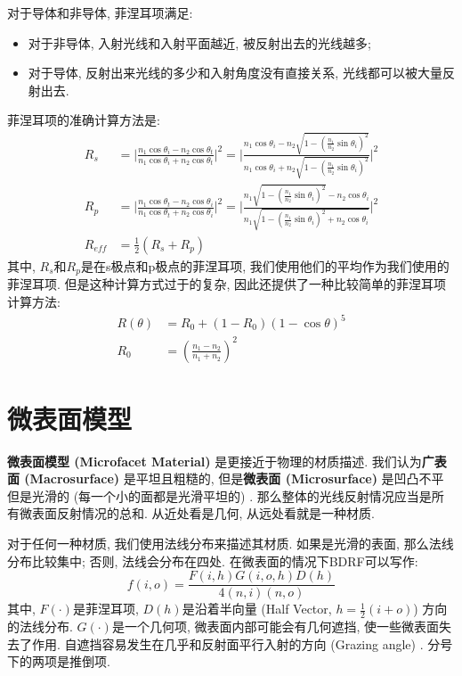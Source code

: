 \documentclass[openany]{progbookcn}
\begin{document}
对于导体和非导体, 菲涅耳项满足: 
\begin{itemize}
	\item 对于非导体, 入射光线和入射平面越近, 被反射出去的光线越多; 
	\item 对于导体, 反射出来光线的多少和入射角度没有直接关系, 光线都可以被大量反射出去. 
\end{itemize}

菲涅耳项的准确计算方法是: 
\begin{equation}
	\begin{split}
		R_s&= \lvert\frac{n_1\cos\theta_i-n_2\cos\theta_t}{n_1\cos\theta_i+n_2\cos\theta_t}\rvert^2 = \lvert{\frac{n_1\cos\theta_i-n_2\sqrt{1-(\frac{n_1}{n_2}\sin\theta_i)^2}}{n_1\cos\theta_i+n_2\sqrt{1-(\frac{n_1}{n_2}\sin\theta_i)^2}}}\rvert^2\\
		R_p&= \lvert\frac{n_1\cos\theta_t-n_2\cos\theta_i}{n_1\cos\theta_t+n_2\cos\theta_i}\rvert^2 = \lvert{\frac{n_1\sqrt{1-(\frac{n_1}{n_2}\sin\theta_i)^2}-n_2\cos\theta_i}{n_1\sqrt{1-(\frac{n_1}{n_2}\sin\theta_i)^2+n_2\cos\theta_i}}}\rvert^2\\
		R_{eff}&=\frac{1}{2}(R_s+R_p)
	\end{split}
\end{equation}
其中, $R_s$和$R_p$是在s极点和p极点的菲涅耳项, 我们使用他们的平均作为我们使用的菲涅耳项. 但是这种计算方式过于的复杂, 因此还提供了一种比较简单的菲涅耳项计算方法: 
\begin{equation}
	\begin{split}
		R(\theta)&=R_0+(1-R_0)(1-\cos\theta)^5\\
		R_0&=(\frac{n_1-n_2}{n_1+n_2})^2
	\end{split}
\end{equation}

\section{微表面模型}

\textbf{微表面模型 (Microfacet Material) }是更接近于物理的材质描述. 我们认为\textbf{广表面 (Macrosurface) }是平坦且粗糙的, 但是\textbf{微表面 (Microsurface) }是凹凸不平但是光滑的 (每一个小的面都是光滑平坦的) . 那么整体的光线反射情况应当是所有微表面反射情况的总和. 从近处看是几何, 从远处看就是一种材质. 

对于任何一种材质, 我们使用法线分布来描述其材质. 如果是光滑的表面, 那么法线分布比较集中; 否则, 法线会分布在四处. 在微表面的情况下BDRF可以写作: 
\begin{equation}
	f(i,o)=\frac{F(i,h)G(i,o,h)D(h)}{4(n,i)(n,o)}
\end{equation}
其中, $F(\cdot)$是菲涅耳项, $D(h)$是沿着半向量 (Half Vector, $h=\frac{1}{2}(i+o)$) 方向的法线分布. $G(\cdot)$是一个几何项, 微表面内部可能会有几何遮挡, 使一些微表面失去了作用. 自遮挡容易发生在几乎和反射面平行入射的方向 (Grazing angle) . 分号下的两项是推倒项. 
\end{document}
